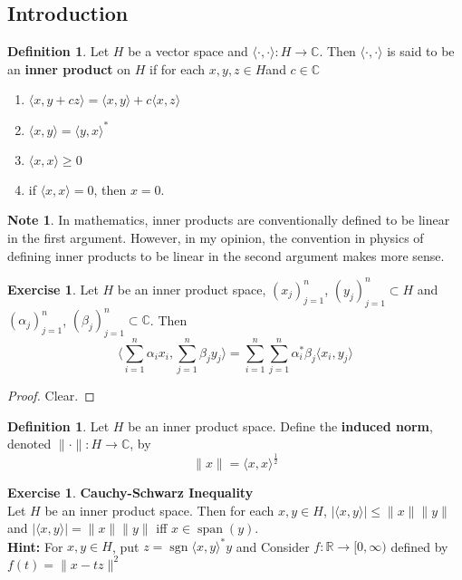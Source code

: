 \documentclass[12pt]{amsart}
\theoremstyle{definition}
\newtheorem{defn}[definition]{Definition}
\newtheorem{note}[definition]{Note}
\newtheorem{ex}[definition]{Exercise}
\newcommand{\al}{\alpha}
\newcommand{\be}{\beta}
\newcommand{\C}{\mathbb{C}}
\newcommand{\R}{\mathbb{R}}
\renewcommand{\r}{\rangle}
\renewcommand{\l}{\langle}
\newcommand{\Rg}{[0,\infty)}
\DeclareMathOperator{\sgn}{sgn}
\DeclareMathOperator{\spn}{span}
\begin{document}
	\subsection{Introduction}
	
	\begin{defn}
		Let $H$ be a vector space and $\l \cdot, \cdot \r: H \rightarrow \C$. Then $\l \cdot, \cdot \r$ is said to be an \textbf{inner product} on $H$ if for each $x,y,z \in H$and $c \in \C$
		\begin{enumerate}
			\item $\l x , y + cz\r = \l x , y \r + c\l x , z\r $
			\item $\l x , y \r = \l y , x\r^*$
			\item $\l x , x \r \geq 0$
			\item if $\l x ,x \r = 0$, then $x = 0$.  
		\end{enumerate}
	\end{defn}
	
	\begin{note}
	In mathematics, inner products are conventionally defined to be linear in the first argument. However, in my opinion, the convention in physics of defining inner products to be linear in the second argument makes more sense.
	\end{note}
	 
	\begin{ex}
	Let $H$ be an inner product space, $(x_j)_{j =1}^n$, $(y_j)_{j =1}^n \subset H$ and $(\al_j)_{j=1}^n$, $(\be_j)_{j=1}^n \subset \C$. Then $$\bigg \l \sum_{i=1}^n \al_i x_i , \sum_{j=1}^n \be_j y_j \bigg \r = \sum_{i=1}^n \sum_{j=1}^n \al_i^*\be_j \l x_i , y_j \r $$
\end{ex}

\begin{proof}
Clear.
\end{proof}

\begin{defn}
Let $H$ be an inner product space. Define the \textbf{induced norm}, denoted $\|\cdot \|: H \rightarrow \C$, by $$\|x\| = \l x, x\r^{\frac{1}{2}}$$
\end{defn}

\begin{ex} \textbf{Cauchy-Schwarz Inequality}\\
Let $H$ be an inner product space. Then for each $x,y \in H$, $| \l x, y\r | \leq \|x\| \| y\|$ and $| \l x, y\r | = \|x\| \| y\|$ iff $x \in \spn(y)$. \\
\textbf{Hint:} For $x, y \in H$, put $z = \sgn\l x, y \r^*y$ and Consider $f: \R \rightarrow \Rg$ defined by $f(t) = \|x - tz\|^2$
\end{ex}
\end{document}
